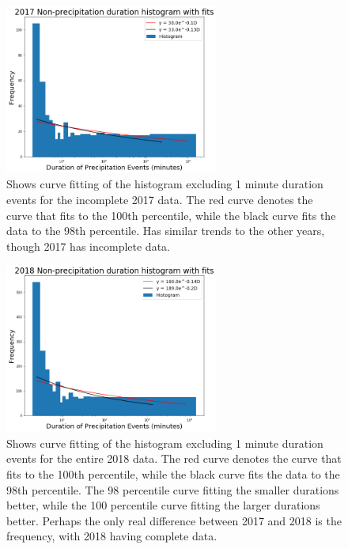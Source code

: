 \documentclass[11pt]{report}
\begin{document}
\clearpage
\begin{figure}[t]
	\centering
	\includegraphics[width=0.625\textwidth]{Figures/nonprecip_2017_new.png}
	\caption[2017 Non-precipitation duration Exponentials with contrasting curve fitting]
	{\label{nonprecip17_redone}
		Shows curve fitting of the histogram excluding 1 minute duration events for the incomplete 2017 data. The red curve denotes the curve that fits to the 100th percentile, while the black curve fits the data to the 98th percentile. Has similar trends to the other years, though 2017 has incomplete data.   }
\end{figure}
\begin{figure}[b]
	\centering
	\includegraphics[width=0.625\textwidth]{Figures/nonprecip_2018_new.png}
	\caption[2018 Non-precipitation duration Exponentials with contrasting curve fitting]
	{\label{nonprecip18_redone}
		Shows curve fitting of the histogram excluding 1 minute duration events for the entire 2018 data. The red curve denotes the curve that fits to the 100th percentile, while the black curve fits the data to the 98th percentile. The 98 percentile curve fitting the smaller durations better, while the 100 percentile curve fitting the larger durations better.  Perhaps the only real difference between 2017 and 2018 is the frequency, with 2018 having complete data.  }
\end{figure}
\end{document}
